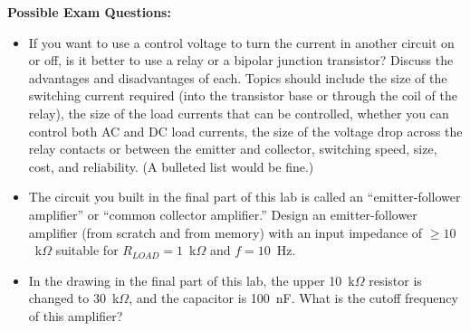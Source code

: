 \begin{enumerate}[wide]
\end{enumerate}

\textbf{Possible Exam Questions:}

\begin{itemize}

\item If you want to use a control voltage to turn the current in another circuit on or off, is it better to use a relay or a bipolar junction transistor?  Discuss the advantages and disadvantages of each.  Topics should include the size of the switching current required (into the transistor base or through the coil of the relay), the size of the load currents that can be controlled, whether you can control both AC and DC load currents, the size of the voltage drop across the relay contacts or between the emitter and collector, switching speed, size, cost, and reliability.  (A bulleted list would be fine.)

\item The circuit you built in the final part of this lab is called an ``emitter-follower amplifier'' or ``common collector amplifier.''  Design an emitter-follower amplifier (from scratch and from memory) with an input impedance of $\ge 10$~k$\Omega$ suitable for $R_{LOAD}=1$~k$\Omega$ and $f=10$~Hz.

\item In the drawing in the final part of this lab, the upper 10~k$\Omega$ resistor is changed to 30~k$\Omega$, and the capacitor is 100~nF.  What is the cutoff frequency of this amplifier?

\end{itemize}







